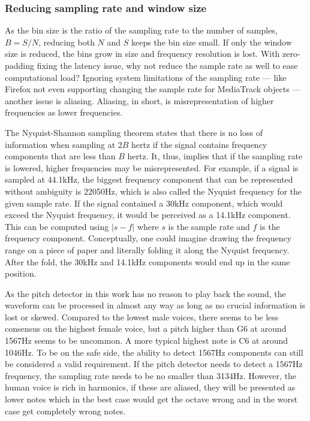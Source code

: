 \subsubsection{Reducing sampling rate and window size}
As the bin size is the ratio of the sampling rate to the number of samples, $B = S/N$, reducing both $N$ and $S$ keeps the bin size small. If only the window size is reduced, the bins grow in size and frequency resolution is lost. With zero-padding fixing the latency issue, why not reduce the sample rate as well to ease computational load? Ignoring system limitations of the sampling rate — like Firefox not even supporting changing the sample rate for MediaTrack objects — another issue is aliasing. Aliasing, in short, is misrepresentation of higher frequencies as lower frequencies. 

The Nyquist-Shannon sampling theorem states that there is no loss of information when sampling at $2B$ hertz if the signal contains frequency components that are less than $B$ hertz. It, thus, implies that if the sampling rate is lowered, higher frequencies may be misrepresented. For example, if a signal is sampled at 44.1kHz, the biggest frequency component that can be represented without ambiguity is 22050Hz, which is also called the Nyquist frequency for the given sample rate. If the signal contained a 30kHz component, which would exceed the Nyquist frequency, it would be perceived as a 14.1kHz component. This can be computed using $|s-f|$ where $s$ is the sample rate and $f$ is the frequency component. Conceptually, one could imagine drawing the frequency range on a piece of paper and literally folding it along the Nyquist frequency. After the fold, the 30kHz and 14.1kHz components would end up in the same position.

As the pitch detector in this work has no reason to play back the sound, the waveform can be processed in almost any way as long as no crucial information is lost or skewed. Compared to the lowest male voices, there seems to be less consensus on the highest female voice, but a pitch higher than G6 at around 1567Hz seems to be uncommon. A more typical highest note is C6 at around 1046Hz. To be on the safe side, the ability to detect 1567Hz components can still be considered a valid requirement. If the pitch detector needs to detect a 1567Hz frequency, the sampling rate needs to be no smaller than 3134Hz. However, the human voice is rich in harmonics, if these are aliased, they will be presented as lower notes which in the best case would get the octave wrong and in the worst case get completely wrong notes.

